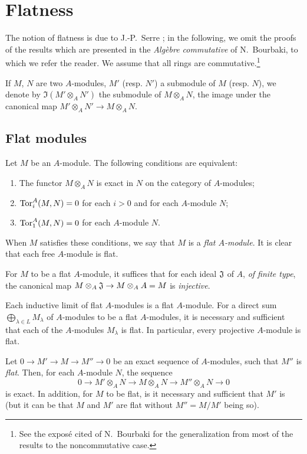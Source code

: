 \section{Flatness}
\label{section:flatness}

\begin{env}[6.0]
\label{0.6.0.0}
The notion of flatness is due to J.-P.~Serre \cite{I-16}; in the following, we omit the
proofs of the results which are presented in the \emph{Alg\`ebre commutative} of N.~Bourbaki,
to which we refer the reader. We assume that all rings are commutative.\footnote{See the
expos\'e cited of N.~Bourbaki for the generalization from most of the results to the
noncommutative case.}

If $M$, $N$ are two $A$-modules, $M'$ (resp. $N'$) a submodule of $M$ (resp. $N$), we denote
by $\Im(M'\otimes_A N')$ the submodule of $M\otimes_A N$, the image under the canonical map
$M'\otimes_A N'\to M\otimes_A N$.
\end{env}

\subsection{Flat modules}
\label{subsection:flat-modules}

\begin{env}[6.1.1]
\label{0.6.1.1}
Let $M$ be an $A$-module. The following conditions are equivalent:
\begin{enumerate}[label=(\alph*)]
  \item The functor $M\otimes_A N$ is exact in $N$ on the category of $A$-modules;
  \item ${\mathop{\mathrm{Tor}}\nolimits}_i^A(M,N)=0$ for each $i>0$ and for each $A$-module $N$;
  \item ${\mathop{\mathrm{Tor}}\nolimits}_1^A(M,N)=0$ for each $A$-module $N$.
\end{enumerate}

When $M$ satisfies these conditions, we say that $M$ is a
\emph{flat $A$-module}. It is clear that each free $A$-module is flat.

For $M$ to be a flat $A$-module, it suffices that for each ideal $\mathfrak{J}$
of $A$, \emph{of finite type}, the canonical map
$M\otimes_A\fk{J}\to M\otimes_A A=M$ is \emph{injective}.
\end{env}

\begin{env}[6.1.2]
\label{0.6.1.2}
Each inductive limit of flat $A$-modules is a flat $A$-module. For a direct sum
$\bigoplus_{\lambda\in L}M_\lambda$ of $A$-modules to be a flat $A$-modules, it
is necessary and sufficient that each of the $A$-modules $M_\lambda$ is flat. In
particular, every projective $A$-module is flat.

Let $0\to M'\to M\to M''\to 0$ be an exact sequence of $A$-modules, such that
$M''$ is \emph{flat}. Then, for each $A$-module $N$, the sequence
\[
  0\to M'\otimes_A N\to M\otimes_A N\to M''\otimes_A N\to 0
\]
is exact.
In addition, for $M$ to be flat, is it necessary and sufficient that $M'$ is (but it can be that $M$ and $M'$ are flat without $M''=M/M'$ being so).
\end{env}


